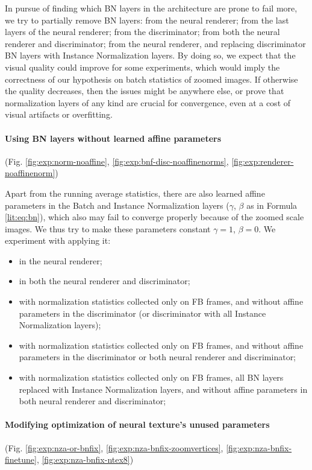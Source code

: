 In pursue of finding which BN layers in the architecture are prone to fail more, we try to partially remove BN layers: from the neural renderer; from the last layers of the neural renderer; from the discriminator; from both the neural renderer and discriminator; from the neural renderer, and replacing discriminator BN layers with Instance Normalization layers. By doing so, we expect that the visual quality could improve for some experiments, which would imply the correctness of our hypothesis on batch statistics of zoomed images. If otherwise the quality decreases, then the issues might be anywhere else, or prove that normalization layers of any kind are crucial for convergence, even at a cost of visual artifacts or overfitting.

\vspace{-15pt}\paragraph{Using BN layers without learned affine parameters}(Fig. \ref{fig:exp:norm-noaffine}, \ref{fig:exp:bnf-disc-noaffinenorms}, \ref{fig:exp:renderer-noaffinenorm})\mbox{}\nopagebreak

Apart from the running average statistics, there are also learned affine parameters in the Batch and Instance Normalization layers ($\gamma$, $\beta$ as in Formula \ref{lit:eq:bn}), which also may fail to converge properly because of the zoomed scale images. We thus try to make these parameters constant $\gamma=1$, $\beta=0$. We experiment with applying it:
\begin{itemize}
	\item in the neural renderer;
	\item in both the neural renderer and discriminator;
	\item with normalization statistics collected only on FB frames, and without affine parameters in the discriminator (or discriminator with all Instance Normalization layers);
	\item with normalization statistics collected only on FB frames, and without affine parameters in the discriminator or both neural renderer and discriminator;
	\item  with normalization statistics collected only on FB frames, all BN layers replaced with Instance Normalization layers, and without affine parameters in both neural renderer and discriminator;
\end{itemize}

\vspace{-15pt}\paragraph{Modifying optimization of neural texture's unused parameters}(Fig. \ref{fig:exp:nza-or-bnfix}, \ref{fig:exp:nza-bnfix-zoomvertices}, \ref{fig:exp:nza-bnfix-finetune}, \ref{fig:exp:nza-bnfix-ntex8})\mbox{}\nopagebreak

